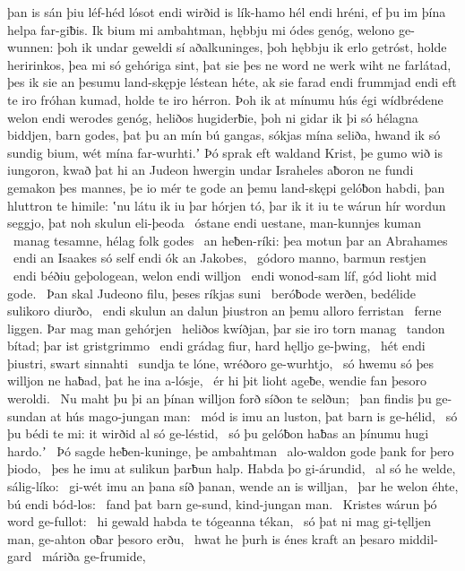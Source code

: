 þan is sán þiu léf-héd lósot endi wirðid is lík-hamo
hél endi hréni, ef þu im þína helpa far-giƀis.
Ik bium mi ambahtman, hębbju mi ódes genóg,
welono ge-wunnen: þoh ik undar geweldi sí
aðalkuninges, þoh hębbju ik erlo getróst,
holde heririnkos, þea mi só gehóriga sint,
þat sie þes ne word ne werk wiht ne farlátad,
þes ik sie an þesumu land-skępje léstean héte,
ak sie farad endi frummjad endi eft te iro fróhan kumad,
holde te iro hérron. Þoh ik at mínumu hús égi
wídbrédene welon endi werodes genóg,
heliðos hugiderƀie, þoh ni gidar ik þi só hélagna
biddjen, barn godes, þat þu an mín bú gangas,
sókjas mína seliða, hwand ik só sundig bium,
wét mína far-wurhti.ʼ Þó sprak eft waldand Krist,
þe gumo wið is iungoron, kwað þat hi an Judeon hwergin
undar Israheles aƀoron ne fundi
gemakon þes mannes, þe io mér te gode
an þemu land-skępi gelóƀon habdi,
þan hluttron te himile: ʽnu látu ik iu þar hórjen tó,
þar ik it iu te wárun hír wordun seggjo,
þat noh skulun eli-þeoda \hld\ óstane endi uestane,
man-kunnjes kuman \hld\ manag tesamne,
hélag folk godes \hld\ an heƀen-ríki:
þea motun þar an Abrahames \hld\ endi an Isaakes só self
endi ók an Jakobes, \hld\ gódoro manno,
barmun restjen \hld\ endi béðiu geþologean,
welon endi willjon \hld\ endi wonod-sam líf,
gód lioht mid gode. \hld\ Þan skal Judeono filu,
þeses ríkjas suni \hld\ beróƀode werðen,
bedélide sulikoro diurðo, \hld\ endi skulun an dalun þiustron
an þemu alloro ferristan \hld\ ferne liggen.
Þar mag man gehórjen \hld\ heliðos kwíðjan,
þar sie iro torn manag \hld\ tandon bítad;
þar ist gristgrimmo \hld\ endi grádag fiur,
hard hęlljo ge-þwing, \hld\ hét endi þiustri,
swart sinnahti \hld\ sundja te lóne,
wréðoro ge-wurhtjo, \hld\ só hwemu só þes willjon ne haƀad,
þat he ina a-lósje, \hld\ ér hi þit lioht ageƀe,
wendie fan þesoro weroldi. \hld\ Nu maht þu þi an þínan willjon forð
síðon te selðun; \hld\ þan findis þu ge-sundan at hús
mago-jungan man: \hld\ mód is imu an luston,
þat barn is ge-hélid, \hld\ só þu bédi te mi:
it wirðid al só ge-léstid, \hld\ só þu gelóƀon haƀas
an þínumu hugi hardo.ʼ \hld\ Þó sagde heƀen-kuninge,
þe ambahtman \hld\ alo-waldon gode
þank for þero þiodo, \hld\ þes he imu at sulikun þarƀun halp.
Habda þo gi-árundid, \hld\ al só he welde,
sálig-líko: \hld\ gi-wét imu an þana síð þanan,
wende an is willjan, \hld\ þar he welon éhte,
bú endi bód-los: \hld\ fand þat barn ge-sund,
kind-jungan man. \hld\ Kristes wárun þó
word ge-fullot: \hld\ hi gewald habda
te tógeanna tékan, \hld\ só þat ni mag gi-tęlljen man,
ge-ahton oƀar þesoro erðu, \hld\ hwat he þurh is énes kraft
an þesaro middil-gard \hld\ máriða ge-frumide,
